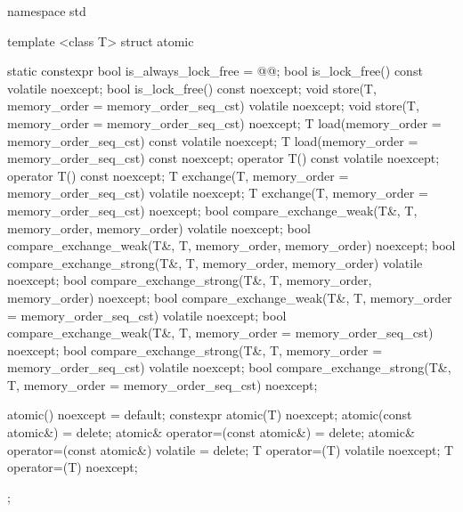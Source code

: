 %
%
%
\begin{codeblock}
namespace std {
  template <class T> struct atomic {
    static constexpr bool is_always_lock_free = @@;
    bool is_lock_free() const volatile noexcept;
    bool is_lock_free() const noexcept;
    void store(T, memory_order = memory_order_seq_cst) volatile noexcept;
    void store(T, memory_order = memory_order_seq_cst) noexcept;
    T load(memory_order = memory_order_seq_cst) const volatile noexcept;
    T load(memory_order = memory_order_seq_cst) const noexcept;
    operator T() const volatile noexcept;
    operator T() const noexcept;
    T exchange(T, memory_order = memory_order_seq_cst) volatile noexcept;
    T exchange(T, memory_order = memory_order_seq_cst) noexcept;
    bool compare_exchange_weak(T&, T, memory_order, memory_order) volatile noexcept;
    bool compare_exchange_weak(T&, T, memory_order, memory_order) noexcept;
    bool compare_exchange_strong(T&, T, memory_order, memory_order) volatile noexcept;
    bool compare_exchange_strong(T&, T, memory_order, memory_order) noexcept;
    bool compare_exchange_weak(T&, T, memory_order = memory_order_seq_cst) volatile noexcept;
    bool compare_exchange_weak(T&, T, memory_order = memory_order_seq_cst) noexcept;
    bool compare_exchange_strong(T&, T, memory_order = memory_order_seq_cst) volatile noexcept;
    bool compare_exchange_strong(T&, T, memory_order = memory_order_seq_cst) noexcept;

    atomic() noexcept = default;
    constexpr atomic(T) noexcept;
    atomic(const atomic&) = delete;
    atomic& operator=(const atomic&) = delete;
    atomic& operator=(const atomic&) volatile = delete;
    T operator=(T) volatile noexcept;
    T operator=(T) noexcept;
  };

}
\end{codeblock}
